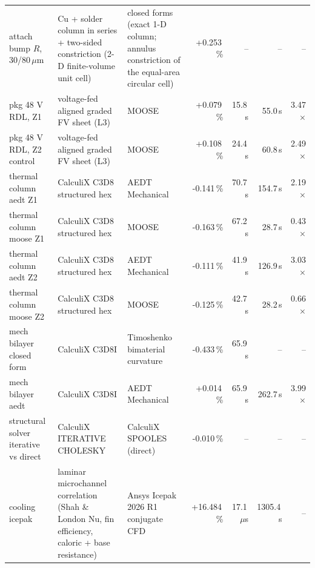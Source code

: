 \begin{table}[!t]
\begin{tabular}{@{}L{3.3cm}L{3.0cm}L{3.6cm}rrrr@{}}
attach bump $R$, 30/80\,$\mu$m & Cu + solder column in series + two-sided constriction (2-D finite-volume unit cell) & closed forms (exact 1-D column; annulus constriction of the equal-area circular cell) & +0.253\,\% & -- & -- & -- \\
pkg 48 V RDL, Z1 & voltage-fed aligned graded FV sheet (L3) & MOOSE & +0.079\,\% & 15.8\,s & 55.0\,s & 3.47$\times$ \\
pkg 48 V RDL, Z2 control & voltage-fed aligned graded FV sheet (L3) & MOOSE & +0.108\,\% & 24.4\,s & 60.8\,s & 2.49$\times$ \\
thermal column aedt Z1 & CalculiX C3D8 structured hex & AEDT Mechanical & -0.141\,\% & 70.7\,s & 154.7\,s & 2.19$\times$ \\
thermal column moose Z1 & CalculiX C3D8 structured hex & MOOSE & -0.163\,\% & 67.2\,s & 28.7\,s & 0.43$\times$ \\
thermal column aedt Z2 & CalculiX C3D8 structured hex & AEDT Mechanical & -0.111\,\% & 41.9\,s & 126.9\,s & 3.03$\times$ \\
thermal column moose Z2 & CalculiX C3D8 structured hex & MOOSE & -0.125\,\% & 42.7\,s & 28.2\,s & 0.66$\times$ \\
mech bilayer closed form & CalculiX C3D8I & Timoshenko bimaterial curvature & -0.433\,\% & 65.9\,s & -- & -- \\
mech bilayer aedt & CalculiX C3D8I & AEDT Mechanical & +0.014\,\% & 65.9\,s & 262.7\,s & 3.99$\times$ \\
structural solver iterative vs direct & CalculiX ITERATIVE CHOLESKY & CalculiX SPOOLES (direct) & -0.010\,\% & -- & -- & -- \\
cooling icepak & laminar microchannel correlation (Shah \& London Nu, fin efficiency, caloric + base resistance) & Ansys Icepak 2026 R1 conjugate CFD & +16.484\,\% & 17.1\,$\mu$s & 1305.4\,s & -- \\
\bottomrule
\end{tabular}
\end{table}
